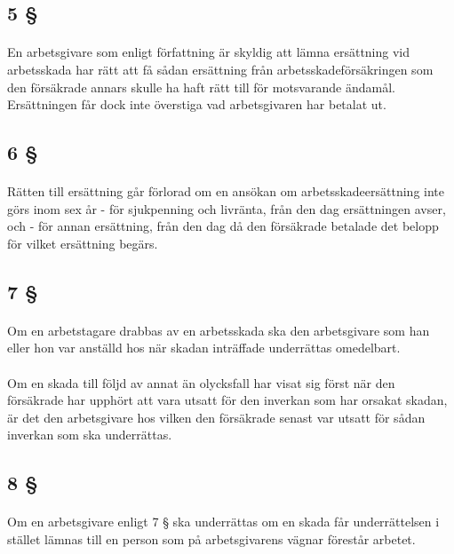 \documentclass[a4paper,notitlepage,openany,10pt]{book}
\begin{document}
\subsection*{5 §}
\paragraph*{}
En arbetsgivare som enligt författning är skyldig att lämna ersättning vid arbetsskada har rätt att få sådan ersättning från arbetsskadeförsäkringen som den försäkrade annars skulle ha haft rätt till för motsvarande ändamål.
Ersättningen får dock inte överstiga vad arbetsgivaren har betalat ut.
\subsection*{6 §}
\paragraph*{}
Rätten till ersättning går förlorad om en ansökan om arbetsskadeersättning inte görs inom sex år
\newline - för sjukpenning och livränta, från den dag ersättningen avser, och
\newline - för annan ersättning, från den dag då den försäkrade betalade det belopp för vilket ersättning begärs.
\subsection*{7 §}
\paragraph*{}
Om en arbetstagare drabbas av en arbetsskada ska den arbetsgivare som han eller hon var anställd hos när skadan inträffade underrättas omedelbart.
\paragraph*{}
Om en skada till följd av annat än olycksfall har visat sig först när den försäkrade har upphört att vara utsatt för den inverkan som har orsakat skadan, är det den arbetsgivare hos vilken den försäkrade senast var utsatt för sådan inverkan som ska underrättas.
\subsection*{8 §}
\paragraph*{}
Om en arbetsgivare enligt 7 § ska underrättas om en skada får underrättelsen i stället lämnas till en person som på arbetsgivarens vägnar förestår arbetet.
\end{document}
